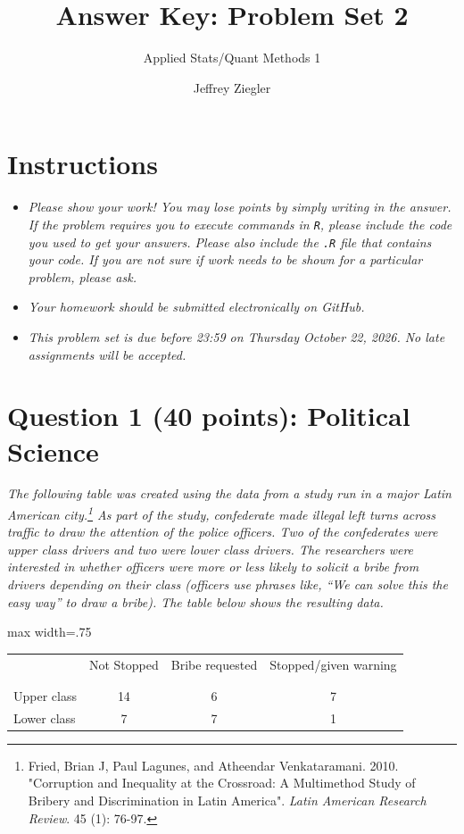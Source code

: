 \documentclass[12pt,letterpaper]{article}
\title{Answer Key: Problem Set 2}
\date{Jeffrey Ziegler}
\author{Applied Stats/Quant Methods 1}
\begin{document}
	\maketitle
	
	\section*{Instructions}
	\begin{itemize}
	\item \textit{Please show your work! You may lose points by simply writing in the answer. If the problem requires you to execute commands in \texttt{R}, please include the code you used to get your answers. Please also include the \texttt{.R} file that contains your code. If you are not sure if work needs to be shown for a particular problem, please ask.}
	\item \textit{Your homework should be submitted electronically on GitHub.}
	\item \textit{This problem set is due before 23:59 on Thursday October 22, 2026. No late assignments will be accepted.}
	\end{itemize}
	
	\vspace{.5cm}
	\section*{Question 1 (40 points): Political Science}
		\vspace{.25cm}
\textit{The following table was created using the data from a study run in a major Latin American city.\footnote{Fried, Brian J, Paul Lagunes, and Atheendar Venkataramani. 2010. "Corruption and Inequality at the Crossroad: A Multimethod Study of Bribery and Discrimination in Latin America". \textit{Latin American Research Review}. 45 (1): 76-97.} As part of the study, confederate made illegal left turns across traffic to draw the attention of the police officers.  Two of the confederates were upper class drivers and two were lower class drivers.  The researchers were interested in whether officers were more or less likely to solicit a bribe from drivers depending on their class (officers use phrases like, ``We can solve this the easy way'' to draw a bribe).  The table below shows the resulting data.}

\begin{table}[h!]
	\centering
	\begin{adjustbox}{max width=.75\textwidth}
		\begin{tabular}{l | c c c }
			& Not Stopped & Bribe requested & Stopped/given warning \\
			\\[-1.8ex] 
			\hline \\[-1.8ex]
			Upper class & 14 & 6 & 7 \\
			Lower class & 7 & 7 & 1 \\
			\hline
		\end{tabular}
	\end{adjustbox}
\end{table}
\end{document}
